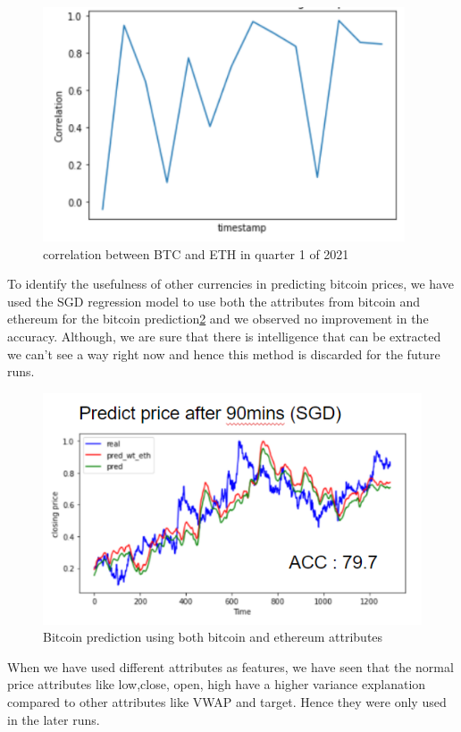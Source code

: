 \documentclass[final]{cvpr}
\begin{document}
\begin{figure}[h!]
\begin{center}
\caption{correlation between BTC and ETH in quarter 1 of 2021}
\includegraphics[width=0.8\linewidth]{latex/btc_eth_cor.PNG}
\end{center}
\label{fig:btceth}
\end{figure}

To identify the usefulness of other currencies in predicting bitcoin prices, we have used the SGD regression model to use both the attributes from bitcoin and ethereum for the bitcoin prediction\ref{fig:btcethpred} and we observed no improvement in the accuracy. Although, we are sure that there is intelligence that can be extracted we can't see a way right now and hence this method is discarded for the future runs.

\begin{figure}[h!]
\begin{center}
\includegraphics[width=0.8\linewidth]{latex/sgd.png}
\end{center}
   \caption{Bitcoin prediction using both bitcoin and ethereum attributes }
\label{fig:btcethpred}
\end{figure}

When we have used different attributes as features, we have seen that the normal price attributes like low,close, open, high have a higher variance explanation compared to other attributes like VWAP and target. Hence they were only used in the later runs.
\end{document}
